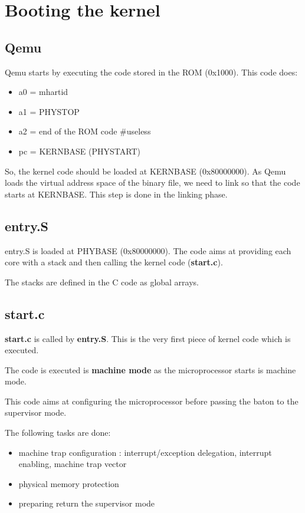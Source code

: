 \documentclass[10pt, a4paper]{article}
\begin{document}
\tableofcontents

\newpage
\section{Booting the kernel}
\subsection{Qemu}

Qemu starts by executing the code stored in the ROM (0x1000).
This code does:
\begin{itemize}
\item a0 = mhartid
\item a1 = PHYSTOP
\item a2 = end of the ROM code \#useless
\item pc = KERNBASE (PHYSTART)
\end{itemize}

So, the kernel code should be loaded at KERNBASE (0x80000000). As Qemu loads the virtual address space of the binary file, we need to link so that the code starts at KERNBASE. This step is done in the linking phase.

\subsection{entry.S}

entry.S is loaded at PHYBASE (0x80000000).
The code aims at providing each core with a stack and then calling the kernel code (\textbf{start.c}).

The stacks are defined in the C code as global arrays.

\subsection{start.c}

\textbf{start.c} is called by \textbf{entry.S}. This is the very first piece of kernel code which is executed. 

The code is executed is \textbf{machine mode} as the microprocessor starts is machine mode.

This code aims at configuring the microprocessor before passing the baton to the supervisor mode.

The following tasks are done:
\begin{itemize}
\item machine trap configuration : interrupt/exception delegation, interrupt enabling, machine trap vector
\item physical memory protection
\item preparing return the supervisor mode \label{aa}
\end{itemize}
\end{document}

